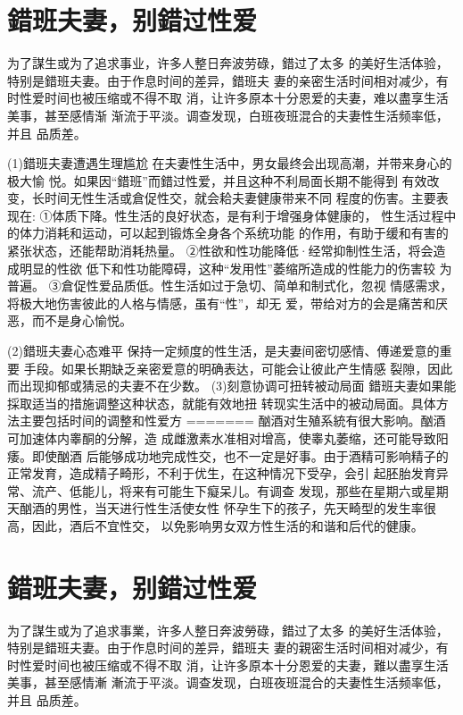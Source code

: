 \documentclass[12pt,UTF8]{ctexbook}
\begin{document}
\section{錯班夫妻，别錯过性爱}

为了謀生或为了追求事业，许多人整日奔波劳碌，錯过了太多
的美好生活体验，特别是錯班夫妻。由于作息时间的差异，錯班夫
妻的亲密生活时间相对减少，有时性爱时间也被压缩或不得不取
消，让许多原本十分恩爱的夫妻，难以盡享生活美事，甚至感情渐
渐流于平淡。调查发现，白班夜班混合的夫妻性生活频率低，并且
品质差。

(1)錯班夫妻遭遇生理尴尬
在夫妻性生活中，男女最终会出现高潮，并带来身心的极大愉
悦。如果因“錯班”而錯过性爱，并且这种不利局面长期不能得到
有效改变，长时间无性生活或倉促性交，就会耠夫妻健康带来不同
程度的伤害。主要表现在:
①体质下降。性生活的良好状态，是有利于增强身体健康的，
性生活过程中的体力消耗和运动，可以起到锻炼全身各个系统功能
的作用，有助于缓和有害的紧张状态，还能帮助消耗热量。
②性欲和性功能降低·经常抑制性生活，将会造成明显的性欲
低下和性功能障碍，这种“发用性”萎缩所造成的性能力的伤害较
为普遍。
③倉促性爱品质低。性生活如过于急切、简单和制式化，忽视
情感需求，将极大地伤害彼此的人格与情感，虽有“性”，却无
爱，带给对方的会是痛苦和厌恶，而不是身心愉悦。

(2)錯班夫妻心态难平
保持一定频度的性生活，是夫妻间密切感情、傅递爱意的重要
手段。如果长期缺乏亲密爱意的明确表达，可能会让彼此产生情感
裂隙，因此而出现抑郁或猜忌的夫妻不在少数。
(3)刻意协调可扭转被动局面
錯班夫妻如果能採取适当的措施调整这种状态，就能有效地扭
转现实生活中的被动局面。具体方法主要包括时间的调整和性爱方
=======
酗酒对生殖系統有很大影响。酗酒可加速体内睾酮的分解，造
成雌激素水准相对增高，使睾丸萎缩，还可能导致阳痿。即使酗酒
后能够成功地完成性交，也不一定是好事。由于酒精可影响精子的
正常发育，造成精子畸形，不利于优生，在这种情况下受孕，会引
起胚胎发育异常、流产、低能儿，将来有可能生下癡呆儿。有调查
发现，那些在星期六或星期天酗酒的男性，当天进行性生活使女性
怀孕生下的孩子，先天畸型的发生率很高，因此，酒后不宜性交，
以免影响男女双方性生活的和谐和后代的健康。

\section{錯班夫妻，别錯过性爱}

为了謀生或为了追求事業，许多人整日奔波勞碌，錯过了太多
的美好生活体验，特别是錯班夫妻。由于作息时间的差异，錯班夫
妻的親密生活时间相对减少，有时性爱时间也被压缩或不得不取
消，让许多原本十分恩爱的夫妻，難以盡享生活美事，甚至感情漸
漸流于平淡。调查发现，白班夜班混合的夫妻性生活频率低，并且
品质差。
\end{document}
